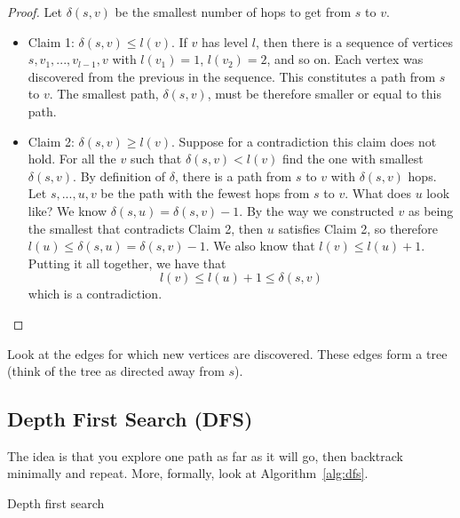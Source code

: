 \begin{proof}
    Let $\delta(s, v)$ be the smallest number of hops to get from $s$
    to $v$.
    \begin{itemize}
        \item Claim 1: $\delta(s, v) \leq l(v)$. If $v$ has level $l$,
        then there is a sequence of vertices $s, v_1, ..., v_{l-1}, v$
        with $l(v_1) = 1$, $l(v_2) = 2$, and so on. Each vertex was
        discovered from the previous in the sequence. This constitutes
        a path from $s$ to $v$. The smallest path, $\delta(s, v)$,
        must be therefore smaller or equal to this path.
        \item Claim 2: $\delta(s, v) \geq l(v)$. Suppose for a
        contradiction this claim does not hold. For all the $v$ such
        that
        $\delta(s, v) < l(v)$ find the one with smallest $\delta(s,
        v)$. By definition of $\delta$, there is a path from $s$ to
        $v$ with $\delta(s, v)$ hops. Let $s, ..., u, v$ be the path
        with the fewest hops from $s$ to $v$. What does $u$ look like?
        We know $\delta(s, u) = \delta(s, v) - 1$. By the way we
        constructed
        $v$ as being the smallest that contradicts Claim 2, then $u$
        satisfies Claim 2, so therefore $l(u) \leq
        \delta(s, u) = \delta(s, v) - 1$.
        We also know that $l(v) \leq l(u) + 1$. Putting it all
        together, we have that
        $$
        l(v) \leq l(u) + 1 \leq \delta(s, v)
        $$
        which is a contradiction.
    \end{itemize}
\end{proof}

\begin{remark}
    Look at the edges for which new vertices are discovered. These 
edges form a tree (think of the tree as directed away from $s$).
\end{remark}

\subsection{Depth First Search (DFS)}

The idea is that you explore one path as far as it will go, then
backtrack minimally and repeat. More, formally, look at
Algorithm~\ref{alg:dfs}.


\begin{algorithm}
\caption{Depth first search}
\begin{algorithmic}
\ENDIF
\ENDFOR
\end{algorithmic}
\label{alg:dfs}
\end{algorithm}

